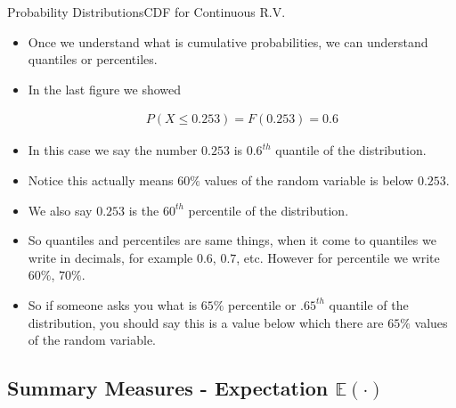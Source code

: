 \documentclass[8pt, usepdftitle=false]{beamer}
\begin{document}
\begin{frame}[allowframebreaks]{Probability Distributions}{CDF for Continuous R.V.}
\begin{itemize}
\item  Once we understand what is cumulative probabilities, we can understand \alert{quantiles} or \alert{percentiles}.

\item In the last figure we showed


\begin{align*}
P ( X \leq 0.253) = F(0.253) = 0.6
\end{align*}

\item In this case we say the number $0.253$ is $0.6^{th}$ \alert{quantile} of the distribution. 

\item Notice this actually means $60\%$ values of the random variable is below $0.253$.

\item We also say $0.253$ is the $60^{th}$ \alert{percentile} of the distribution.

\item So quantiles and percentiles are same things, when it come to quantiles we write in decimals, for example $0.6$, $0.7$, etc. However for percentile we write $60\%$, $70\%$.

\item So if someone asks you what is $65\%$ percentile or $.65^{th}$ quantile of the distribution, you should say this is a value below which there are $65\%$ values of the random variable.




\end{itemize}
\end{frame}


\subsection{Summary Measures - Expectation $\mathbb{E}(\cdot)$ }
\frame{\subsectionpage}
\end{document}
